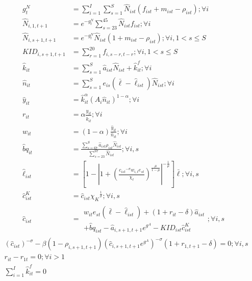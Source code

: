 \documentclass[letterpaper,12pt]{article}
\theoremstyle{definition}
\numberwithin{equation}{section}
\begin{document}
\begin{spacing}{1.5}
	\begin{align}
		g^N_t & = \sum_{i=1}^I \sum_{s=1}^S \hat N_{ist} (f_{ist}+m_{ist}-\rho_{ist}) ; \forall i \label{eq_4gNdef}\\
		\hat N_{i,1,t+1} & = e^{-g^N_t}\sum_{s=23}^{45} \hat N_{ist} f_{ist} ; \forall i\\
		\hat N_{i,s+1,t+1} & = e^{-g^N_t}\hat N_{ist} (1+m_{ist}-\rho_{ist}); \forall i, 1<s\le S \label{eq_4pop2} \\
		{KID}_{i,s+1,t+1} & = \sum_{r=1}^{20} f_{i,s-r,t-r}; \forall i, 1<s\le S \label{eq_4kids}\\
		\hat k_{it} & = \sum_{s=1}^S \hat a_{ist} \hat N_{ist} + \hat k_{it}^f; \forall i \label{eq_4ksum} \\
		\hat n_{it} & = \sum_{s=1}^S e_{is} (\bar \ell - \hat \ell_{ist}) \hat N_{ist}; \forall i \label{eq_4nsum} \\
		\hat y_{it} & = \hat k_{it}^\alpha \left( A_{i} \hat n_{it} \right)^{1-\alpha} ; \forall i \label{eq_4yfunc} \\
		r_{it} & = \alpha \frac{\hat y_{it}}{\hat k_{it}}; \forall i \label{eq_4rfunc} \\
		w_{it} & = (1-\alpha) \frac{\hat y_{it}}{\hat n_{it}}; \forall i \label{eq_4wfunc} \\
		\hat bq_{it} & = \frac{\sum_{s=67}^S \hat a_{ist} \rho_{ist} \hat N_{ist}}{\sum_{s=23}^{67} \hat N_{ist}} ; \forall i,s \label{eq_4bqfunc} \\
		\hat \ell_{ist} & = \left[ 1 - \left| 1 + \left( \frac{{c_{ist}}^{-\sigma} w_{i,t} e_{st}}{\chi_\ell} \right)^{\frac{\mu}{1-\mu}} \right|^{-\frac{1}{\mu}} \right] \bar \ell; \forall i,s \label{eq_4elldef} \\
		\hat c^K_{ist} & = \hat c_{ist} {\chi_K}^{\frac{1}{\sigma}}; \forall i,s \label{eq_4cKdef} \\
		\hat c_{ist} & = \begin{matrix} w_{it} e_{st} (\bar \ell - \hat \ell_{ist}) + (1+r_{it}-\delta)\hat a_{ist} \\ +\hat bq_{ist} - \hat a_{i,s+1,t+1} e^{g^A} - {KID}_{ist} \hat c^K_{ist} \end{matrix}; \forall i,s \label{eq_4BC}
	\end{align}
	\begin{align}
		& \left({\hat c_{ist}}\right)^{-\sigma} - \beta (1-\rho_{i,s+1,t+1}) \left(\hat c_{i,s+1,t+1} e^{g^A}\right)^{-\sigma}(1+r_{1,t+1}-\delta) = 0; \forall i,s \label{eq_4Euler} \\
		& r_{it} - r_{1t} = 0; \forall i>1 \label{eq_4requal} \\
		& \sum_{i=1}^I \hat k^f_{it} = 0 \label{eq_4kfsum}
	\end{align}


\end{spacing}
\end{document}

